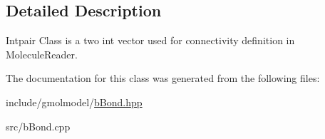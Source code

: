 \subsection{Detailed Description}
Intpair Class is a two int vector used for connectivity definition in Molecule\+Reader. 

The documentation for this class was generated from the following files\+:\begin{DoxyCompactItemize}
\item 
include/gmolmodel/\hyperlink{bBond_8hpp}{b\+Bond.\+hpp}\item 
src/b\+Bond.\+cpp\end{DoxyCompactItemize}
